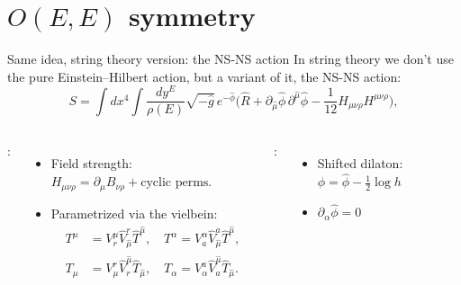 \documentclass{beamer}
\begin{document}
\section{$O(E,E)$ symmetry}
\begin{frame}{Same idea, string theory version: the NS-NS action}
    In string theory we don't use the pure Einstein--Hilbert action, but a variant of it, the NS-NS action:
    \begin{equation*} 
    \boxed{S = \int d x^4 \int \frac{d y^E}{\rho(E)}\sqrt{- \hat g } \, e^{ - \hat \phi} \Big(\hat R +  \partial_{\hat \mu}\hat \phi \, \partial^{\hat \mu}\hat \phi - \frac{1}{12}  H_{ \mu \nu \rho}H^{ \mu\nu \rho}\Big),}
\end{equation*} \pause
\begin{columns}
    :\\
    \begin{itemize}
        \item Field strength: $H_{ \mu \nu \rho} = \partial_ \mu B_{\nu \rho} + \text{cyclic perms.}$
        \item Parametrized via the vielbein:
    \begin{align*}
        T^{\mu} &= V_r^\mu \hat V^r_{\hat \mu}\hat T^{\hat \mu},  \quad
        T^{\alpha} = V_a^\alpha \hat V^a_{\hat \mu}\hat T^{\hat \mu}, \\ 
        T_{\mu} &= V_\mu^r \hat V_r^{\hat \mu}\hat T_{\hat \mu}, \quad
        T_{\alpha} = V_\alpha^a \hat V_a^{\hat \mu}\hat T_{\hat \mu}.
    \end{align*}
    \end{itemize}
    :\\
    \begin{itemize}
        \item Shifted dilaton: $\phi = \hat \phi -\frac{1}{2} \log{h}$
        \item $\partial_\alpha \hat \phi = 0 $
    \end{itemize}
    \vspace{16mm}
\end{columns}
\end{frame}
\end{document}
